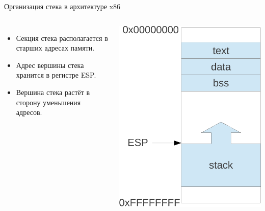 \documentclass[utf8, russian]{beamer}
\begin{document}
    \begin{frame}{Организация стека в архитектуре x86}
        \begin{columns}
        \begin{itemize}
            \item Секция стека располагается в старших адресах памяти. 
            \item Адрес вершины стека хранится в регистре ESP.
            \item Вершина стека растёт в сторону уменьшения адресов. 
        \end{itemize}
            \includegraphics[width=\linewidth]{fig/segments.pdf}
        \end{columns}
    \end{frame}
\end{document}
